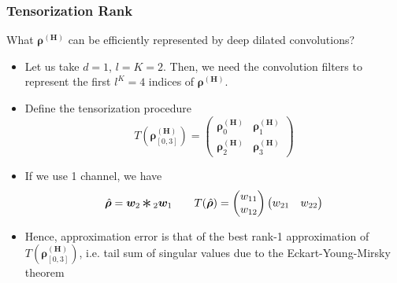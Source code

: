 \begin{frame}
	\frametitle{Tensorization Rank}

	What ${\bm \rho^{(\bm H)}}$ can be efficiently represented by deep dilated convolutions?

	\begin{itemize}[<+->]
		\item
		Let us take $d=1$, $l=K=2$. Then, we need the convolution filters to represent the first $l^K = 4$ indices of $\bm \rho^{(\bm H)}$.
		\item
		Define the tensorization procedure
		\begin{equation*}
			T(
				{\bm \rho}^{(\bm H)}_{[0,3]}
			)
			=
			\begin{pmatrix}
				{\bm \rho}^{(\bm H)}_{0} &
				{\bm \rho}^{(\bm H)}_{1} \\
				{\bm \rho}^{(\bm H)}_{2} &
				{\bm \rho}^{(\bm H)}_{3}
			\end{pmatrix}
		\end{equation*}
		\item
		If we use 1 channel, we have
		\begin{equation*}
			\wh{\bm \rho}
			= {\bm w_2} \Conv{}_{2} {\bm w_1}
			\qquad
			T(
				\wh{\bm \rho}
			)
			=
			\begin{pmatrix}
				w_{11} \\
				w_{12}
			\end{pmatrix}
			\begin{pmatrix}
				w_{21} &
				w_{22}
			\end{pmatrix}
		\end{equation*}
		\item
		Hence, approximation error is that of the best rank-1 approximation of
		$T({\bm \rho}^{(\bm H)}_{[0,3]})$, i.e. tail sum of singular values
		due to the \alert{Eckart-Young-Mirsky theorem}
	\end{itemize}

\end{frame}

